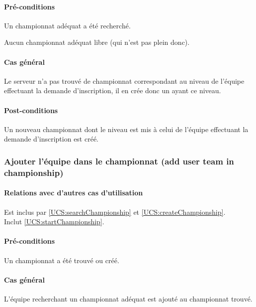 \paragraph{Pré-conditions}
\begin{list}{}{\leftmargin=1.5em}
\item{Un championnat adéquat a été recherché.}
\item{Aucun championnat adéquat libre (qui n'est pas plein donc). }
\end{list}
\paragraph{Cas général}
Le serveur n'a pas trouvé de championnat correspondant au niveau de l'équipe effectuant la demande d'inscription, il en crée donc un ayant ce niveau.
\paragraph{Post-conditions}
\begin{list}{}{\leftmargin=1.5em}
\item{Un nouveau championnat dont le niveau est mis à celui de l'équipe effectuant la demande d'inscription est créé.}
\end{list}

\subsubsection{Ajouter l'équipe dans le championnat (add user team in championship)}
\label{UCS:addTeam}
\paragraph{Relations avec d'autres cas d'utilisation}
Est inclus par \ref{UCS:searchChampionship} et \ref{UCS:createChampionship}.\\
Inclut \ref{UCS:startChampionship}.
\paragraph{Pré-conditions}
\begin{list}{}{\leftmargin=1.5em}
\item{Un championnat a été trouvé ou créé.}
\end{list}
\paragraph{Cas général}
L'équipe recherchant un championnat adéquat est ajouté au championnat trouvé. 
